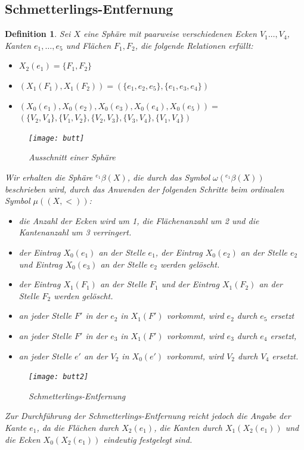 \documentclass[12pt,titlepage,twoside,cleardoublepage]{article}
\theoremstyle{nummermitklammern}
\newtheorem{definition}[temp]{Definition}
\newtheorem{definition}[zahl]{Definition}
\numberwithin{equation}{section}
\begin{document}
  \subsection{Schmetterlings-Entfernung}
 \begin{definition}
 Sei $X$ eine Sphäre mit paarweise verschiedenen Ecken $V_1\ldots ,V_4$, Kanten $e_1,\ldots,e_5$ und Flächen $F_1,F_2$,
 die folgende Relationen erfüllt: 
 \begin{itemize}
 \item $X_2(e_1)=\{F_1,F_2\}$
  \item $(X_1(F_1),X_1(F_2))=(\{e_1,e_2,e_5\},\{e_1,e_3,e_4\})$
 \item   $(X_0(e_1),X_0(e_2),X_0(e_3),X_0(e_4),X_0(e_5)) =$ \\$ (\{V_2,V_4\},\{V_1,V_2\},\{V_2,V_3\},\{V_3,V_4\},\{V_1,V_4\})$
\end{itemize}  

\begin{figure}[H]
\begin{center}
\texttt{[image: butt]}
\end{center}
\caption{Ausschnitt einer Sphäre}
\end{figure}

Wir erhalten die Sphäre ${}^{e_1}\beta(X)$, die durch das Symbol $\omega({}^{e_1}\beta(X))$ beschrieben wird, durch das Anwenden der folgenden Schritte beim ordinalen Symbol $\mu((X,<))$: 
\begin{itemize}
\item die Anzahl der Ecken wird um 1, die Flächenanzahl um 2 und die Kantenanzahl um 3 verringert.
\item der Eintrag $X_0(e_1)$ an der Stelle $e_1$, der Eintrag $X_0(e_2)$ an der Stelle $e_2$ und Eintrag $X_0(e_3)$ an der Stelle $e_2$ werden gelöscht. 
\item der Eintrag $X_1(F_1)$ an der Stelle $F_1$ und der Eintrag $X_1(F_2)$ an der Stelle $F_2$ werden gelöscht. 
\
\item an jeder Stelle ${F}'$ in der $e_2$ in $X_1({F}')$ vorkommt, wird $e_2$ durch $e_5$ ersetzt
\item an jeder Stelle ${F}'$ in der $e_3$ in $X_1({F}')$ vorkommt, wird $e_3$ durch $e_4$ ersetzt,
\item an jeder Stelle ${e}'$ an der $V_2$ in $X_0({e}')$ vorkommt, wird $V_2$ durch $V_4$ ersetzt.
\end{itemize}
\begin{figure}[H]
\begin{center}
\texttt{[image: butt2]}
\end{center}
\caption{Schmetterlings-Entfernung}
\end{figure}
Zur Durchführung der Schmetterlings-Entfernung reicht jedoch die Angabe der Kante $e_1$, da die Flächen durch $X_2(e_1)$, die Kanten durch $X_1(X_2(e_1))$ und die Ecken $X_0(X_2(e_1))$ eindeutig festgelegt sind. 
 \end{definition}
\end{document}
